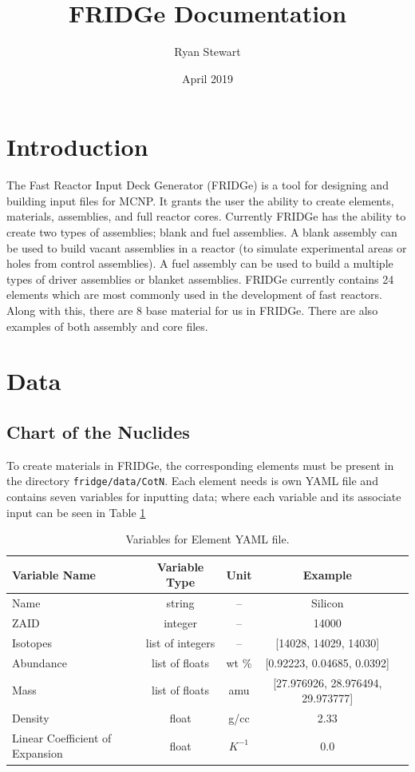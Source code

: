 \documentclass{article}
\title{FRIDGe Documentation}
\author{Ryan Stewart}
\date{April 2019}
\begin{document}
\maketitle

\section{Introduction}

The Fast Reactor Input Deck Generator (FRIDGe) is a tool for designing and building input files for MCNP. It grants the user the ability to create elements, materials, assemblies, and full reactor cores. Currently FRIDGe has the ability to create two types of assemblies; blank and fuel assemblies. A blank assembly can be used to build vacant assemblies in a reactor (to simulate experimental areas or holes from control assemblies). A fuel assembly can be used to build a multiple types of driver assemblies or blanket assemblies. FRIDGe currently contains 24 elements which are most commonly used in the development of fast reactors. Along with this, there are 8 base material for us in FRIDGe. There are also examples of both assembly and core files.

\section{Data}

\subsection{Chart of the Nuclides}

To create materials in FRIDGe, the corresponding elements must be present in the directory \verb|fridge/data/CotN|. Each element needs is own YAML file and contains seven variables for inputting data; where each variable and its associate input can be seen in Table \ref{tab:element}

\begin{table}
	\centering
	\caption{Variables for Element YAML file.}
	\begin{tabular}{lcccc}\toprule
		Variable Name   & Variable Type & Unit & Example 
		\\
		\hline
		Name  & string & -- & Silicon
		\\
		ZAID & integer &-- & 14000
		\\
	    Isotopes & list of integers & --& [14028, 14029, 14030]
		\\
		Abundance & list of floats & wt \% & [0.92223, 0.04685, 0.0392]
		\\
		Mass & list of floats &  amu & [27.976926, 28.976494, 29.973777]
		\\
		Density & float & g/cc & 2.33
		\\
		Linear Coefficient of Expansion & float & $K^{-1}$ &0.0
		\\
		\bottomrule
	\end{tabular}
	\label{tab:element}
\end{table}
\end{document}
